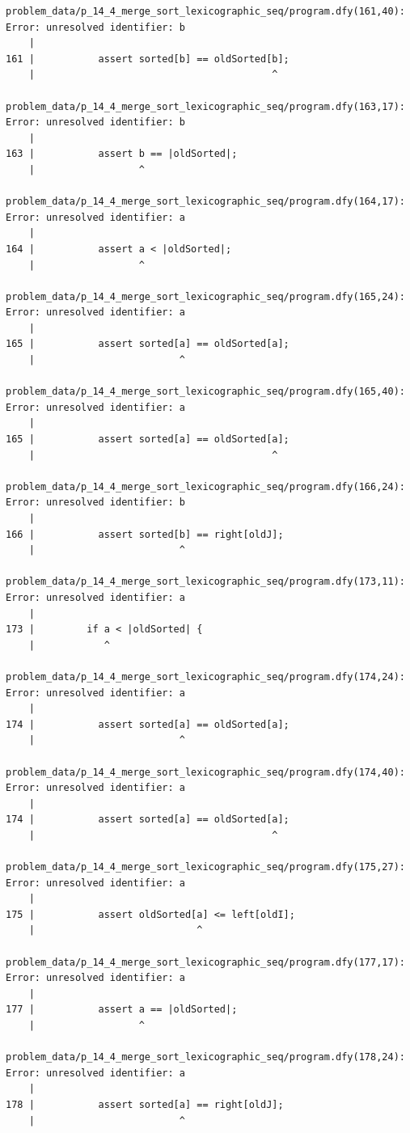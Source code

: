 \documentclass{article}
\begin{document}
\begin{lstlisting}
problem_data/p_14_4_merge_sort_lexicographic_seq/program.dfy(161,40): Error: unresolved identifier: b
    |
161 |           assert sorted[b] == oldSorted[b];
    |                                         ^

problem_data/p_14_4_merge_sort_lexicographic_seq/program.dfy(163,17): Error: unresolved identifier: b
    |
163 |           assert b == |oldSorted|;
    |                  ^

problem_data/p_14_4_merge_sort_lexicographic_seq/program.dfy(164,17): Error: unresolved identifier: a
    |
164 |           assert a < |oldSorted|;
    |                  ^

problem_data/p_14_4_merge_sort_lexicographic_seq/program.dfy(165,24): Error: unresolved identifier: a
    |
165 |           assert sorted[a] == oldSorted[a];
    |                         ^

problem_data/p_14_4_merge_sort_lexicographic_seq/program.dfy(165,40): Error: unresolved identifier: a
    |
165 |           assert sorted[a] == oldSorted[a];
    |                                         ^

problem_data/p_14_4_merge_sort_lexicographic_seq/program.dfy(166,24): Error: unresolved identifier: b
    |
166 |           assert sorted[b] == right[oldJ];
    |                         ^

problem_data/p_14_4_merge_sort_lexicographic_seq/program.dfy(173,11): Error: unresolved identifier: a
    |
173 |         if a < |oldSorted| {
    |            ^

problem_data/p_14_4_merge_sort_lexicographic_seq/program.dfy(174,24): Error: unresolved identifier: a
    |
174 |           assert sorted[a] == oldSorted[a];
    |                         ^

problem_data/p_14_4_merge_sort_lexicographic_seq/program.dfy(174,40): Error: unresolved identifier: a
    |
174 |           assert sorted[a] == oldSorted[a];
    |                                         ^

problem_data/p_14_4_merge_sort_lexicographic_seq/program.dfy(175,27): Error: unresolved identifier: a
    |
175 |           assert oldSorted[a] <= left[oldI];
    |                            ^

problem_data/p_14_4_merge_sort_lexicographic_seq/program.dfy(177,17): Error: unresolved identifier: a
    |
177 |           assert a == |oldSorted|;
    |                  ^

problem_data/p_14_4_merge_sort_lexicographic_seq/program.dfy(178,24): Error: unresolved identifier: a
    |
178 |           assert sorted[a] == right[oldJ];
    |                         ^


\end{lstlisting}
\end{document}
